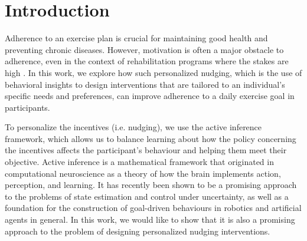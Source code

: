 \documentclass[manuscript,screen,review]{acmart}
\begin{document}

\begin{teaserfigure}
  \caption{}
  \Description{}
  \label{fig:teaser}
\end{teaserfigure}


\maketitle

\section{Introduction}

Adherence to an exercise plan is crucial for maintaining good health and preventing chronic diseases. However,
motivation is often a major obstacle to adherence, even in the context of rehabilitation programs where the stakes
are high \cite{daly2002barriers}. In this work, we explore how such personalized nudging, which is the use of behavioral insights to design interventions that are tailored to an individual’s specific needs and preferences, can improve adherence to a daily exercise goal in participants.

To personalize the incentives (i.e. nudging), we use the active inference framework, which allows us to
balance
learning about how the policy concerning the incentives affects the participant’s behaviour and helping them meet
their objective. Active inference is a mathematical framework that originated in computational neuroscience as a
theory of how the brain implements action, perception, and learning. It has recently been shown to be a promising
approach to the problems of state estimation and control under uncertainty, as well as a foundation for the
construction of goal-driven behaviours in robotics and artificial agents in general. In this work, we would like to
show that it is also a promising approach to the problem of designing personalized nudging interventions.
\end{document}
